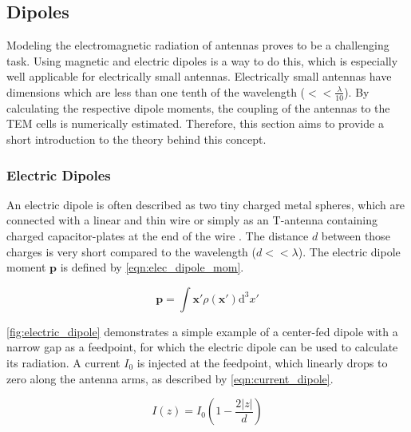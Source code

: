 \subsection{Dipoles}
Modeling the electromagnetic radiation of antennas proves to be a challenging task. Using magnetic and electric dipoles is a way to do this, which is especially well applicable for electrically small antennas. Electrically small antennas have dimensions which are less than one tenth of the wavelength ($<<\frac{\lambda}{10}$)\cite{Balanis_1997}. By calculating the respective dipole moments, the coupling of the antennas to the TEM cells is numerically estimated. Therefore, this section aims to provide a short introduction to the theory behind this concept.

\subsubsection{Electric Dipoles}
An electric dipole is often described as two tiny charged metal spheres, which are connected with a linear and thin wire \cite{Griffiths_2024} or simply as an T-antenna containing charged capacitor-plates at the end of the wire \cite{Balanis_1997}. The distance $d$ between those charges is very short compared to the wavelength ($d << \lambda$).%
The electric dipole moment $\mathbf{p}$ is defined by \autoref{eqn:elec_dipole_mom}\cite{Balanis_1997}\cite{Jackson}. %

\begin{equation}
    \mathbf{p} = \int\mathbf{x'} \rho (\mathbf{x'})\mathrm{d}^3x'
    \label{eqn:elec_dipole_mom}
\end{equation}

\autoref{fig:electric_dipole} demonstrates a simple example of a center-fed dipole with a narrow gap as a feedpoint, for which the electric dipole can be used to calculate its radiation\cite{Griffiths_2024}\cite{Jackson}. A current $I_0$ is injected at the feedpoint, which linearly drops to zero along the antenna arms, as described by \autoref{eqn:current_dipole}\cite{Jackson}.

\begin{equation}
    I(z)= I_0\left( 1-\frac{2|z|}{d} \right)
    \label{eqn:current_dipole}
\end{equation}



